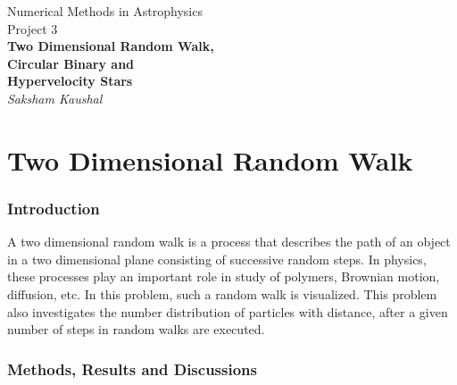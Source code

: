 \documentclass[a4paper]{article}
\begin{document}
	
	
	\begin{titlepage}
		\begin{center}
			\Large Numerical Methods in Astrophysics \\
			\vspace{1cm}
			\huge{
				Project 3 \\
				\vspace{0.5cm}
				\textbf{Two Dimensional Random Walk,}\\
				\textbf{Circular Binary and} \\
				\textbf{Hypervelocity Stars} \\
				\vspace{1cm}
			}
			\Large \emph{Saksham Kaushal}
		\end{center}
	\end{titlepage}
	
	
	\tableofcontents
	\newpage
	
	
	\part{Two Dimensional Random Walk} \label{problem1}
	
		
		\section{Introduction} \label{1:introduction}
		
		A two dimensional random walk is a process that describes the path of an object in a two dimensional plane consisting of successive random steps. In physics, these processes play an important role in study of polymers, Brownian motion, diffusion, etc. In this problem, such a random walk is visualized. This problem also investigates the number distribution of particles with distance, after a given number of steps in random walks are executed.
		
		
		\section{Methods, Results and Discussions} \label{1:methods_results}
		
\end{document}
